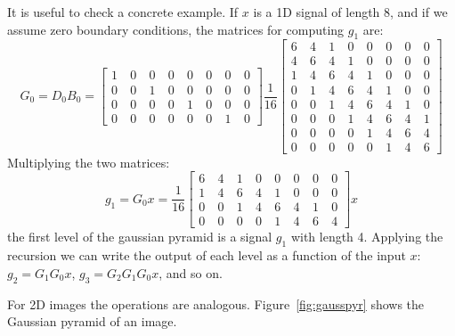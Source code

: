 It is useful to check a concrete example. If $x$ is a 1D signal of length 8, and if we assume zero boundary conditions, the matrices for computing $g_1$ are:
\begin{equation}
G_0 = D_0 B_0 =
\begin{bmatrix}
  1 ~& 0 ~& 0 ~& 0 ~& 0 ~& 0 ~& 0 ~& 0 \\
  0 ~& 0 ~& 1 ~& 0 ~& 0 ~& 0 ~& 0 ~& 0 \\
  0 ~& 0 ~& 0 ~& 0 ~& 1 ~& 0 ~& 0 ~& 0 \\
  0 ~& 0 ~& 0 ~& 0 ~& 0 ~& 0 ~& 1 ~& 0
 \end{bmatrix}
 \frac{1}{16}
 \begin{bmatrix}
  6 ~& 4 ~& 1 ~& 0 ~& 0 ~& 0 ~& 0 ~& 0 \\
  4 ~& 6 ~& 4 ~& 1 ~& 0 ~& 0 ~& 0 ~& 0 \\
  1 ~& 4 ~& 6 ~& 4 ~& 1 ~& 0 ~& 0 ~& 0 \\
  0 ~& 1 ~& 4 ~& 6 ~& 4 ~& 1 ~& 0 ~& 0 \\
  0 ~& 0 ~& 1 ~& 4 ~& 6 ~& 4 ~& 1 ~& 0 \\
  0 ~& 0 ~& 0 ~& 1 ~& 4 ~& 6 ~& 4 ~& 1 \\
  0 ~& 0 ~& 0 ~& 0 ~& 1 ~& 4 ~& 6 ~& 4 \\
  0 ~& 0 ~& 0 ~& 0 ~& 0 ~& 1 ~& 4 ~& 6 
\end{bmatrix}
\end{equation}
Multiplying the two matrices:
\begin{equation}
g_{1} = G_0 x = 
 \frac{1}{16}
 \begin{bmatrix}
  6 ~& 4 ~& 1 ~& 0 ~& 0 ~& 0 ~& 0 ~& 0 \\
  1 ~& 4 ~& 6 ~& 4 ~& 1 ~& 0 ~& 0 ~& 0 \\
  0 ~& 0 ~& 1 ~& 4 ~& 6 ~& 4 ~& 1 ~& 0 \\
  0 ~& 0 ~& 0 ~& 0 ~& 1 ~& 4 ~& 6 ~& 4 
 \end{bmatrix}
 x
 \end{equation}
the first level of the gaussian pyramid is a signal $g_1$ with length 4. Applying the recursion we can write the output of each level as a function of the input $x$:  $g_{2} = G_1 G_0 x$, $g_{3} = G_2 G_1 G_0 x$, and so on. 
 
For 2D images the operations are analogous. Figure~\ref{fig:gausspyr} shows the Gaussian pyramid of an image. 


